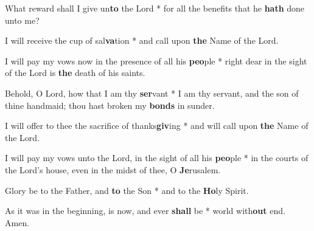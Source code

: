 \begin{multicols}{2}
	What reward shall I give un\textbf{to} the Lord * for all the benefits that he \textbf{hath} done unto me?
	
	I will receive the cup of sal\textbf{va}tion * and call upon \textbf{the} Name of the Lord.
	
	I will pay my vows now in the presence of all his \textbf{peo}ple * right dear in the sight of the Lord is \textbf{the} death of his saints.
	
	Behold, O Lord, how that I am thy \textbf{ser}vant * I am thy servant, and the son of thine handmaid; thou hast broken my \textbf{bonds} in sunder.
	
	I will offer to thee the sacrifice of thanks\textbf{giv}ing * and will call upon \textbf{the} Name of the Lord.
	
	I will pay my vows unto the Lord, in the sight of all his \textbf{peo}ple * in the courts of the Lord's house, even in the midst of thee, O \textbf{Je}rusalem.
	
	Glory be to the Father, and \textbf{to} the Son * and to the \textbf{Ho}ly Spirit.
	
	As it was in the beginning, is now, and ever \textbf{shall} be * world with\textbf{out} end. Amen.
\end{multicols}